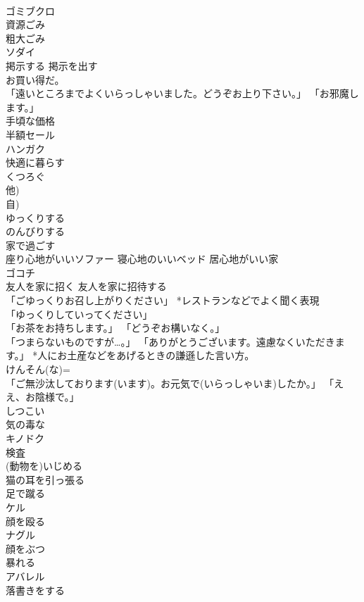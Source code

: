 \documentclass[8pt]{extreport}
\begin{document}
\begin{CJK}{UTF8}{min}
\\	ゴミブクロ
\\	資源ごみ	
\\	粗大ごみ	
\\	ソダイ
\\	掲示する 掲示を出す	
\\	お買い得だ。	
\\	「遠いところまでよくいらっしゃいました。どうぞお上り下さい。」 「お邪魔します。」	
\\	手頃な価格	
\\	半額セール	
\\	ハンガク
\\	快適に暮らす	
\\	くつろぐ	
\\	他) 
\\	自)
\\	ゆっくりする 
\\	のんびりする	
\\	家で過ごす	
\\	座り心地がいいソファー 寝心地のいいベッド 居心地がいい家	
\\	ゴコチ
\\	友人を家に招く 友人を家に招待する	
\\	「ごゆっくりお召し上がりください」 *レストランなどでよく聞く表現	
\\	「ゆっくりしていってください」	
\\	「お茶をお持ちします。」 「どうぞお構いなく。」	
\\	「つまらないものですが…。」 「ありがとうございます。遠慮なくいただきます。」 *人にお土産などをあげるときの謙遜した言い方。	
\\	けんそん(な)=
\\	「ご無沙汰しております(います)。お元気で(いらっしゃいま)したか。」 「ええ、お陰様で。」	
\\	しつこい	
\\	気の毒な	
\\	キノドク
\\	検査	
\\	(動物を)いじめる	
\\	猫の耳を引っ張る	
\\	足で蹴る	
\\	ケル
\\	顔を殴る	
\\	ナグル
\\	顔をぶつ	
\\	暴れる	
\\	アバレル
\\	落書きをする	

\end{CJK}
\end{document}
